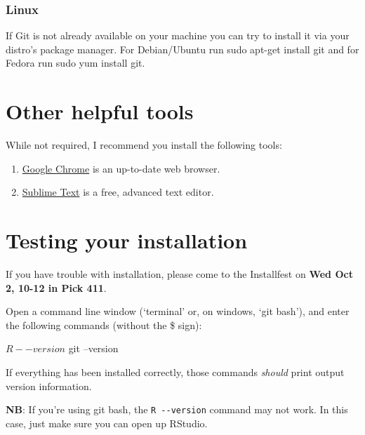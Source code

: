 \documentclass[]{book}
\newenvironment{Shaded}{\begin{snugshade}}{\end{snugshade}}
\newcommand{\FunctionTok}[1]{\textcolor[rgb]{0.00,0.00,0.00}{#1}}
\newcommand{\ExtensionTok}[1]{#1}
\newcommand{\NormalTok}[1]{#1}
\begin{document}
\subsubsection*{Linux}\label{linux-1}

If Git is not already available on your machine you can try to install
it via your distro's package manager. For Debian/Ubuntu run sudo apt-get
install git and for Fedora run sudo yum install git.

\section{Other helpful tools}\label{other-helpful-tools}

While not required, I recommend you install the following tools:

\begin{enumerate}
\def\labelenumi{\arabic{enumi}.}
\item
  \href{https://www.google.com/chrome/}{Google Chrome} is an up-to-date
  web browser.
\item
  \href{https://www.sublimetext.com/3}{Sublime Text} is a free, advanced
  text editor.
\end{enumerate}

\section{Testing your installation}\label{testing-your-installation}

If you have trouble with installation, please come to the Installfest on
\textbf{Wed Oct 2, 10-12 in Pick 411}.

Open a command line window (`terminal' or, on windows, `git bash'), and
enter the following commands (without the \$ sign):

\begin{Shaded}
\begin{Highlighting}[]
\NormalTok{$ }\ExtensionTok{R}\NormalTok{ --version}
\NormalTok{$ }\FunctionTok{git}\NormalTok{ --version}
\end{Highlighting}
\end{Shaded}

If everything has been installed correctly, those commands \emph{should}
print output version information.

\textbf{NB}: If you're using git bash, the \texttt{R\ -\/-version}
command may not work. In this case, just make sure you can open up
RStudio.
\end{document}
